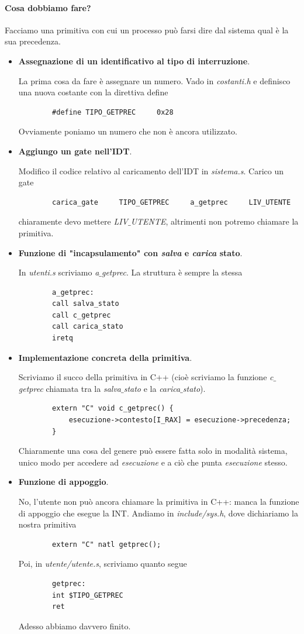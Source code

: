 \paragraph{Cosa dobbiamo fare?} Facciamo una primitiva con cui un processo può farsi dire dal sistema qual è la sua precedenza.
\begin{itemize}
	\item \textbf{Assegnazione di un identificativo al tipo di interruzione}. 
	
	La prima cosa da fare è assegnare un numero. Vado in \emph{costanti.h} e definisco una nuova costante con la direttiva define
	\begin{verbatim}
		#define TIPO_GETPREC     0x28
	\end{verbatim}
	Ovviamente poniamo un numero che non è ancora utilizzato.
	
	\item \textbf{Aggiungo un gate nell'IDT}.
	
	Modifico il codice relativo al caricamento dell'IDT in \emph{sistema.s}. Carico un gate 
	\begin{verbatim}
		carica_gate     TIPO_GETPREC     a_getprec     LIV_UTENTE
	\end{verbatim}
	chiaramente devo mettere \emph{LIV$\_$UTENTE}, altrimenti non potremo chiamare la primitiva.
	
	\item \textbf{Funzione di "incapsulamento" con \emph{salva} e \emph{carica} stato}. 
	
	In \emph{utenti.s} scriviamo \emph{a$\_$getprec}. La struttura è sempre la stessa
	\begin{verbatim}
		a_getprec:
		call salva_stato
		call c_getprec
		call carica_stato
		iretq
	\end{verbatim}
	
	\item \textbf{Implementazione concreta della primitiva}. 
	
	Scriviamo il succo della primitiva in C++ (cioè scriviamo la funzione \emph{c$\_$getprec} chiamata tra la \emph{salva$\_$stato} e la \emph{carica$\_$stato}).
	\begin{verbatim}
		extern "C" void c_getprec() {
			esecuzione->contesto[I_RAX] = esecuzione->precedenza;
		}
	\end{verbatim}
	Chiaramente una cosa del genere può essere fatta solo in modalità sistema, unico modo per accedere ad \emph{esecuzione} e a ciò che punta \emph{esecuzione} stesso.
	\item \textbf{Funzione di appoggio}. 
	
	No, l'utente non può ancora chiamare la primitiva in C++: manca la funzione di appoggio che esegue la INT. Andiamo in \emph{include/sys.h}, dove dichiariamo la nostra primitiva
	\begin{verbatim}
		extern "C" natl getprec();
	\end{verbatim}
	Poi, in \emph{utente/utente.s}, scriviamo quanto segue
	\begin{verbatim}
		getprec:    
		int $TIPO_GETPREC
		ret
	\end{verbatim}
	Adesso abbiamo davvero finito.
\end{itemize}
